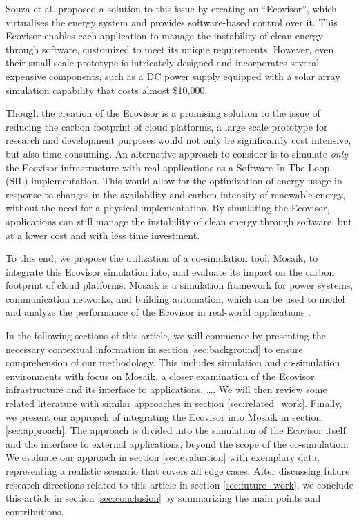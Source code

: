 Souza et al. \cite{souza2023} proposed a solution to this issue by creating an
\enquote{Ecovisor}, which virtualises the energy system and provides
software-based control over it. This Ecovisor enables each application to manage
the instability of clean energy through software, customized to meet its unique
requirements. However, even their small-scale prototype is intricately designed
and incorporates several expensive components, such as a DC power supply
equipped with a solar array simulation capability that costs almost \$10,000.

Though the creation of the Ecovisor is a promising solution to the issue of
reducing the carbon footprint of cloud platforms, a large scale prototype for
research and development purposes would not only be significantly cost
intensive, but also time consuming. An alternative approach to consider is to
simulate \emph{only} the Ecovisor infrastructure with real applications as a
Software-In-The-Loop (SIL) implementation. This would allow for the optimization
of energy usage in response to changes in the availability and carbon-intensity
of renewable energy, without the need for a physical implementation. By
simulating the Ecovisor, applications can still manage the instability of clean
energy through software, but at a lower cost and with less time investment.

To this end, we propose the utilization of a co-simulation tool, Mosaik, to
integrate this Ecovisor simulation into, and evaluate its impact on the carbon
footprint of cloud platforms. Mosaik is a simulation framework for power
systems, communication networks, and building automation, which can be used to
model and analyze the performance of the Ecovisor in real-world applications
\cite{steinbrink2019}. \medskip

In the following sections of this article, we will commence by presenting the
necessary contextual information in section \ref{sec:background} to ensure
comprehension of our methodology. This includes simulation and co-simulation
environments with focus on Mosaik, a closer examination of the Ecovisor
infrastructure and its interface to applications, \dots. We will then review
some related literature with similar approaches in section
\ref{sec:related_work}. Finally, we present our approach of integrating the
Ecovisor into Mosaik in section \ref{sec:approach}. The approach is divided into
the simulation of the Ecovisor itself and the interface to external
applications, beyond the scope of the co-simulation. We evaluate our approach in
section \ref{sec:evaluation} with exemplary data, representing a realistic
scenario that covers all edge cases. After discussing future research directions
related to this article in section \ref{sec:future_work}, we conclude this
article in section \ref{sec:conclusion} by summarizing the main points and
contributions.
